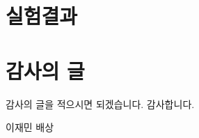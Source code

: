 \documentclass[master,korean,final]{cbnu-ecs}
\begin{document}
\chapter{실험결과}


%
%
%


\chapter*{감사의 글}

감사의 글을 적으시면 되겠습니다.
감사합니다.

\begin{flushright}
\vspace{1cm}
이재민 배상
\end{flushright}
\end{document}
